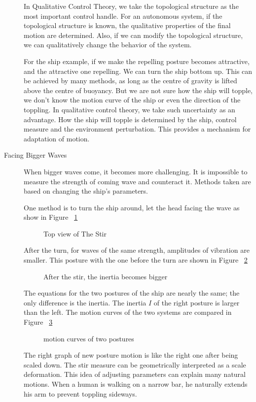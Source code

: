 \begin{description}
In Qualitative Control Theory, 
we take the topological structure as the most important control handle.
For an autonomous system, if the topological structure is known, the qualitative properties of the final motion are determined.
Also, if we can modify the topological structure, we can qualitatively change the behavior of the system.

For the ship example, if we make the repelling posture becomes attractive, and the attractive one repelling.
We can turn the ship bottom up.
This can be achieved by many methods, as long as the centre of gravity is lifted above the centre of buoyancy.
But we are not sure how the ship will topple, 
we don't know the motion curve of the ship or even the direction of the toppling. 
In qualitative control theory, we take such uncertainty as an advantage.
How the ship will topple is determined by the ship, control measure and the environment perturbation.
This provides a mechanism for adaptation of motion.



\item[Facing Bigger Waves]
When bigger waves come, it becomes more challenging.
It is impossible to measure the strength of coming wave and counteract it. 
Methods taken are based on changing the ship's parameters.

One method is to turn the ship around, let the head facing the wave as show in Figure ~\ref{fig:ship_stir}
\begin{figure}

\caption{Top view of The Stir}
\label{fig:ship_stir}
\end{figure}

After the turn, for waves of the same strength, amplitudes of vibration are smaller.
This posture with the one before the turn are shown in Figure ~\ref{fig:ship_stir2D}
\begin{figure}

\caption{After the stir, the inertia becomes bigger}
\label{fig:ship_stir2D}
\end{figure}
The equations for the two postures of the ship are nearly the same; the only difference is the inertia.
The inertia $I$ of the right posture is larger than the left.
The motion curves of the two systems are compared in Figure ~\ref{fig:more_stable}
\begin{figure}

\caption{motion curves of two postures}
\label{fig:more_stable}
\end{figure}

The right graph of new posture motion is like the right one after being scaled down.
The stir measure can be geometrically interpreted as a scale deformation. 
This idea of adjusting parameters can explain many natural motions.
When a human is walking on a narrow bar, he naturally extends his arm to prevent toppling sideways.


\end{description}
